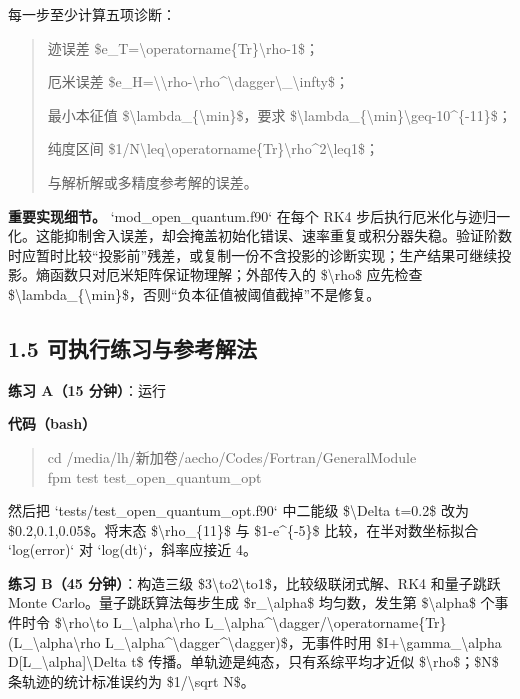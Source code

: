 \documentclass[UTF8,openany,11pt,fontset=fandol]{ctexbook}
\begin{document}
每一步至少计算五项诊断：

\begin{quote}
迹误差
\$e\_T=\textbar\textbackslash operatorname\{Tr\}\textbackslash rho-1\textbar\$；

厄米误差
\$e\_H=\textbackslash\textbar\textbackslash rho-\textbackslash rho\^{}\textbackslash dagger\textbackslash\textbar\_\textbackslash infty\$；

最小本征值 \$\textbackslash lambda\_\{\textbackslash min\}\$，要求
\$\textbackslash lambda\_\{\textbackslash min\}\textbackslash geq-10\^{}\{-11\}\$；

纯度区间
\$1/N\textbackslash leq\textbackslash operatorname\{Tr\}\textbackslash rho\^{}2\textbackslash leq1\$；

与解析解或多精度参考解的误差。
\end{quote}

\textbf{重要实现细节。} `mod\_open\_quantum.f90` 在每个 RK4
步后执行厄米化与迹归一化。这能抑制舍入误差，却会掩盖初始化错误、速率重复或积分器失稳。验证阶数时应暂时比较``投影前''残差，或复制一份不含投影的诊断实现；生产结果可继续投影。熵函数只对厄米矩阵保证物理解；外部传入的
\$\textbackslash rho\$ 应先检查
\$\textbackslash lambda\_\{\textbackslash min\}\$，否则``负本征值被阈值截掉''不是修复。

\subsection{\texorpdfstring{\textbf{1.5
可执行练习与参考解法}}{1.5 可执行练习与参考解法}}\label{ux53efux6267ux884cux7ec3ux4e60ux4e0eux53c2ux8003ux89e3ux6cd5}

\textbf{练习 A（15 分钟）}：运行

\textbf{代码（bash）}

\begin{quote}
cd /media/lh/新加卷/aecho/Codes/Fortran/GeneralModule\\
fpm test test\_open\_quantum\_opt
\end{quote}

然后把 `tests/test\_open\_quantum\_opt.f90` 中二能级
\$\textbackslash Delta t=0.2\$ 改为 \$0.2,0.1,0.05\$。将末态
\$\textbackslash rho\_\{11\}\$ 与 \$1-e\^{}\{-5\}\$
比较，在半对数坐标拟合 `log(error)` 对 `log(dt)`，斜率应接近 4。

\textbf{练习 B（45 分钟）}：构造三级
\$3\textbackslash to2\textbackslash to1\$，比较级联闭式解、RK4
和量子跳跃 Monte Carlo。量子跳跃算法每步生成 \$r\_\textbackslash alpha\$
均匀数，发生第 \$\textbackslash alpha\$ 个事件时令
\$\textbackslash rho\textbackslash to
L\_\textbackslash alpha\textbackslash rho
L\_\textbackslash alpha\^{}\textbackslash dagger/\textbackslash operatorname\{Tr\}(L\_\textbackslash alpha\textbackslash rho
L\_\textbackslash alpha\^{}\textbackslash dagger\^{}\textbackslash dagger)\$，无事件时用
\$I+\textbackslash gamma\_\textbackslash alpha
D{[}L\_\textbackslash alpha{]}\textbackslash Delta t\$
传播。单轨迹是纯态，只有系综平均才近似 \$\textbackslash rho\$；\$N\$
条轨迹的统计标准误约为 \$1/\textbackslash sqrt N\$。
\end{document}
